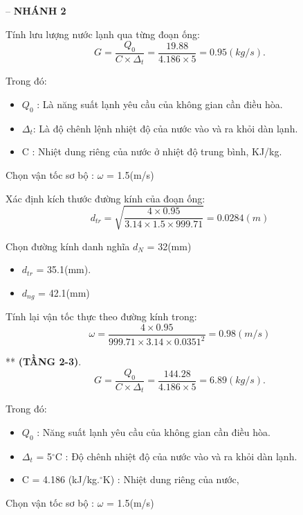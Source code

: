 -- \textbf{NHÁNH 2}

Tính lưu lượng nước lạnh qua từng đoạn ống:
\begin{equation*}
	G = \dfrac{Q_{0}}{C \times \Delta_{t}} =\dfrac{19.88}{4.186 \times 5} = 0.95(kg/s).
\end{equation*}

Trong đó:
\begin{itemize}
	\item $Q_{0}$ : Là năng suất lạnh yêu cầu của không gian cần điều hòa.
	\item $\Delta_{t}$: Là độ chênh lệnh nhiệt độ của nước vào và ra khỏi dàn lạnh.
	\item C : Nhiệt dung riêng của nước ở nhiệt độ trung bình, KJ/kg.
\end{itemize}

Chọn vận tốc sơ bộ : $\omega$ = 1.5(m/s)

Xác định kích thước đường kính của đoạn ống:
\begin{equation*}
	d_{tr} = \sqrt{\dfrac{4 \times 0.95}{3.14 \times 1.5 \times 999.71}} = 0.0284(m)
\end{equation*}

Chọn đường kính danh nghĩa $d_{N}$ = 32(mm)
\begin{itemize}
	\item $d_{tr}$ = 35.1(mm).
	\item $d_{ng}$ = 42.1(mm)
\end{itemize}

Tính lại vận tốc thực theo đường kính trong:
\begin{equation*}
	\omega = \dfrac{4 \times 0.95 }{999.71 \times 3.14 \times 0.0351^{2}} = 0.98(m/s)
\end{equation*}

**\textbf{ (TẦNG 2-3)}.
\begin{equation*}
	G = \dfrac{Q_{0}}{C \times \Delta_{t}} =\dfrac{144.28}{4.186 \times 5} = 6.89(kg/s).
\end{equation*}

Trong đó:
\begin{itemize}
	\item $Q_{0}$ : Năng suất lạnh yêu cầu của không gian cần điều hòa.
	\item $\Delta_{t}$ = 5$^{\circ}$C : Độ chênh nhiệt độ của nước vào và ra khỏi dàn lạnh.
	\item C = 4.186 (kJ/kg.$^{\circ}$K) : Nhiệt dung riêng của nước,
\end{itemize}

Chọn vận tốc sơ bộ : $\omega$ = 1.5(m/s)

